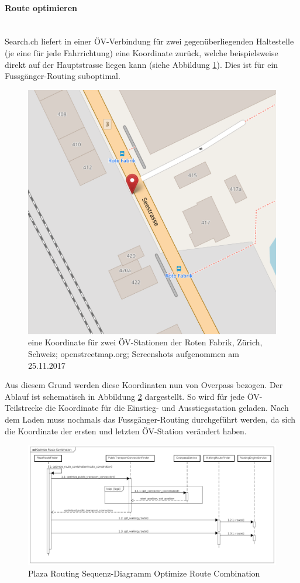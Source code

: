 \paragraph{Route optimieren}\label{impl:Plaza Routing Route optimieren}~\\
Search.ch \cite{search_ch_route_api} liefert in einer ÖV-Verbindung für zwei gegenüberliegenden Haltestelle (je eine für jede Fahrrichtung) eine Koordinate zurück, welche beispielsweise direkt auf der Hauptstrasse liegen kann (siehe Abbildung \ref{fig:one_coordinate_for_two_stops}). Dies ist für ein Fussgänger-Routing suboptimal.

\begin{figure}[ht]
\centering
\includegraphics[width=0.5\linewidth]{projectdoc/img/one_coordinate_for_two_stops}
\caption[eine Koordinate für zwei ÖV-Stationen]{eine Koordinate für zwei ÖV-Stationen der Roten Fabrik, Zürich, Schweiz; openstreetmap.org; Screenshots aufgenommen am 25.11.2017}
\label{fig:one_coordinate_for_two_stops}
\end{figure}

Aus diesem Grund werden diese Koordinaten nun von Overpass \cite{wiki:overpass} bezogen. Der Ablauf ist schematisch in Abbildung \ref{fig:sequence_diagram_plaza_routing_optimize_route_comb} dargestellt. So wird für jede ÖV-Teilstrecke die Koordinate für die Einstieg- und Ausstiegsstation geladen. Nach dem Laden muss nochmals das Fussgänger-Routing durchgeführt werden, da sich die Koordinate der ersten und letzten ÖV-Station verändert haben.

\begin{figure}[ht]
\centering
\includegraphics[width=1\linewidth]{projectdoc/img/sequence_diagram_plaza_routing_optimize_route_comb}
\caption[Plaza Routing Sequenz-Diagramm Optimize Route Combination]{Plaza Routing Sequenz-Diagramm Optimize Route Combination}
\label{fig:sequence_diagram_plaza_routing_optimize_route_comb}
\end{figure}

